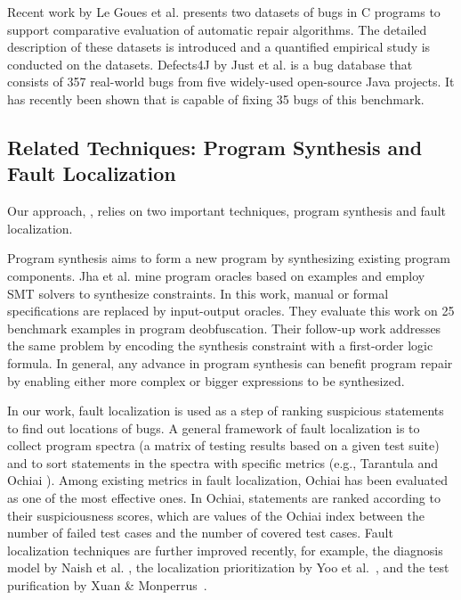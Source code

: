 Recent work by Le Goues et al. \cite{LeGoues15tse} presents two datasets of bugs in C programs to support comparative evaluation of automatic repair algorithms. The detailed description of these datasets is introduced and a quantified empirical study is conducted on the datasets. 
Defects4J by Just et al. \cite{JustJE2014} is a bug database that consists of 357 real-world bugs from five widely-used open-source Java projects. It has recently been shown \cite{durieux2015} that \nopol is capable of fixing 35 bugs of this benchmark.

\subsection{Related Techniques: Program Synthesis and Fault Localization}
\label{subsect:related-localization}

Our approach, \nopol, relies on two important techniques, program synthesis and fault localization. 

Program synthesis aims to form a new program by synthesizing existing program components. Jha et al. \cite{jha2010oracle} mine program oracles based on examples and employ SMT solvers to synthesize constraints. In this work, manual or formal specifications are replaced by input-output oracles. They evaluate this work on 25 benchmark examples in program deobfuscation. Their follow-up work \cite{gulwani2011synthesis} addresses the same problem by encoding the synthesis constraint with a first-order logic formula. In general, any advance in program synthesis can benefit program repair by enabling either more complex or bigger expressions to be synthesized. 

In our work, fault localization is used as a step of ranking suspicious statements to find out locations of bugs. A general framework of fault localization is to collect program spectra (a matrix of testing results based on a given test suite) and to sort statements in the spectra with specific metrics (e.g., Tarantula \cite{jones2002visualization} and Ochiai \cite{abreu2007accuracy}). Among existing metrics in fault localization, Ochiai \cite{abreu2007accuracy} has been evaluated as one of the most effective ones. In Ochiai, statements are ranked according to their suspiciousness scores, which are values of the Ochiai index between the number of failed test cases and the number of covered test cases. Fault localization techniques are further improved recently, for example, the diagnosis model by Naish et al. \cite{naish2011model}, the localization prioritization by Yoo et al.~\cite{yoo2013fault}, and the test purification by Xuan \& Monperrus~\cite{xuan2014test}.

